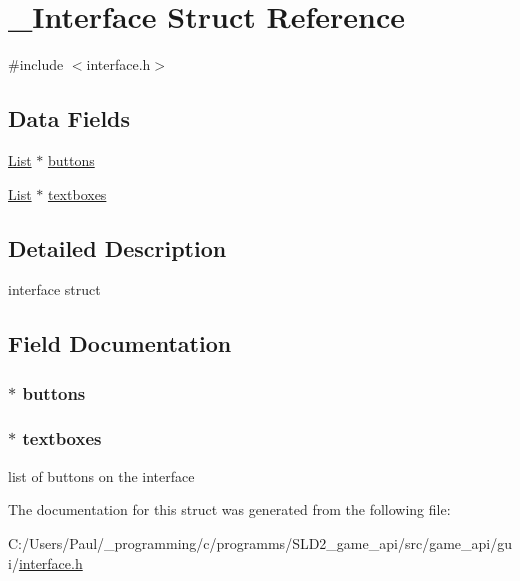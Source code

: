 \hypertarget{struct___interface}{\section{\+\_\+\+Interface Struct Reference}
\label{struct___interface}
}


{\ttfamily \#include $<$interface.\+h$>$}

\subsection*{Data Fields}
\begin{DoxyCompactItemize}
\item 
\hyperlink{list_8h_a6e8df23dc94cc3a5bfe8a30addb6ebbf}{List} $\ast$ \hyperlink{struct___interface_ad2c23a8f255abea926c8982e81ca84a0}{buttons}
\item 
\hyperlink{list_8h_a6e8df23dc94cc3a5bfe8a30addb6ebbf}{List} $\ast$ \hyperlink{struct___interface_afe02db5bce1405040b669fd456fb8825}{textboxes}
\end{DoxyCompactItemize}


\subsection{Detailed Description}
interface struct 

\subsection{Field Documentation}
\hypertarget{struct___interface_ad2c23a8f255abea926c8982e81ca84a0}{
\subsubsection[{buttons}]{$\ast$ buttons}}\label{struct___interface_ad2c23a8f255abea926c8982e81ca84a0}
\hypertarget{struct___interface_afe02db5bce1405040b669fd456fb8825}{
\subsubsection[{textboxes}]{$\ast$ textboxes}}\label{struct___interface_afe02db5bce1405040b669fd456fb8825}
list of buttons on the interface 

The documentation for this struct was generated from the following file\+:\begin{DoxyCompactItemize}
\item 
C\+:/\+Users/\+Paul/\+\_\+programming/c/programms/\+S\+L\+D2\+\_\+game\+\_\+api/src/game\+\_\+api/gui/\hyperlink{interface_8h}{interface.\+h}\end{DoxyCompactItemize}
